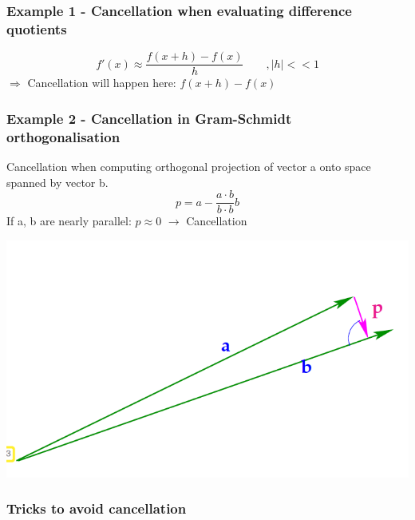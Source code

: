 \documentclass[12pt, a4paper]{article}
\begin{document}
\hspace{5mm}
\subsubsection{Example  1 - Cancellation when evaluating difference quotients}
\begin{equation*}
	f'(x) \approx \frac{f(x+h) - f(x)}{h} \quad \quad , |h|<<1	
\end{equation*}
\hspace{10mm}
$\Rightarrow$ Cancellation will happen here: $f(x+h) - f(x)$


\subsubsection{Example  2 - Cancellation in Gram-Schmidt orthogonalisation}

\begin{minipage}{0.6\textwidth}
Cancellation when computing orthogonal projection of vector a onto space spanned by vector b.
\begin{equation*}
	p = a - \frac{a \cdot b }{b \cdot b}b
\end{equation*}
If a, b are nearly parallel: $p \approx 0$ $\rightarrow$ Cancellation
\end{minipage}
\begin{minipage}{0.3\textwidth}\raggedleft
 		 \includegraphics[width=1.0\textwidth]{cancellation_gramSchmidt.png}
 \end{minipage}



\subsubsection{Tricks to avoid cancellation}
 
\end{document}
